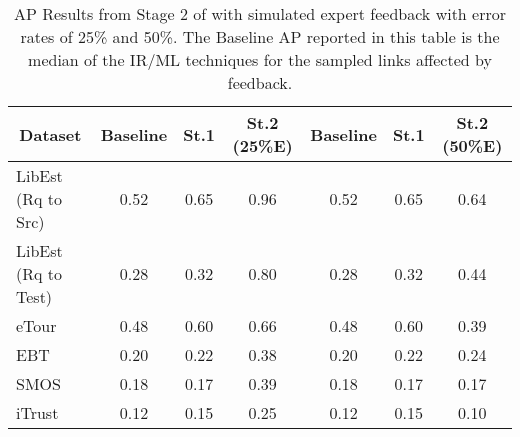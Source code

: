 \begin{table}[h]
	\footnotesize
	\centering
	\caption{\footnotesize AP Results from Stage 2 of \Comet with simulated expert feedback with error rates of 25\% and 50\%. The Baseline AP reported in this table is the median of the IR/ML techniques for the sampled links affected by feedback.}
	\label{tab:stage2-results}
	\setlength{\tabcolsep}{0.1em}
	
\begin{tabular}{@{}l|c|c|c|c|c|c@{}}
\toprule
\multicolumn{1}{c|}{\textbf{Dataset}} & \textbf{Baseline} & \textbf{St.1} & \textbf{St.2 (25\%E)} & \textbf{Baseline} & \textbf{St.1} & \textbf{St.2 (50\%E)} \\ \midrule
LibEst (Rq to Src)  & 0.52 & 0.65 & 0.96 & 0.52 & 0.65 & 0.64 \\
LibEst (Rq to Test) & 0.28 & 0.32 & 0.80 & 0.28 & 0.32 & 0.44 \\
eTour               & 0.48 & 0.60 & 0.66 & 0.48 & 0.60 & 0.39 \\
EBT                 & 0.20 & 0.22 & 0.38 & 0.20 & 0.22 & 0.24 \\
SMOS                & 0.18 & 0.17 & 0.39 & 0.18 & 0.17 & 0.17 \\
iTrust              & 0.12 & 0.15 & 0.25 & 0.12 & 0.15 & 0.10 \\ \bottomrule
\end{tabular}

\end{table}